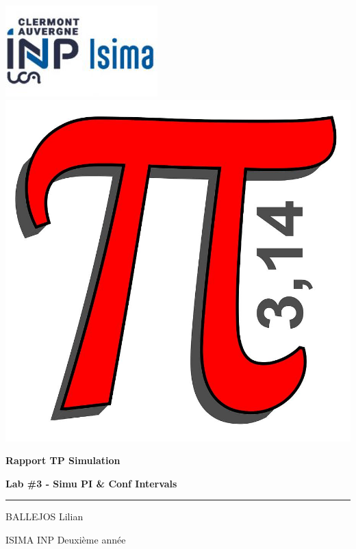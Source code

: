 \documentclass[12pt,french]{article} %
\begin{document}
\begin{titlepage} %

  
  \includegraphics[scale=0.6]{isima.png}
  \includegraphics[scale=0.10]{decoration.jpg}
  
  \vspace*{2.5cm} %
  
  \begin{center}\huge
    \textbf{Rapport TP Simulation} 
    
    \textbf{Lab \#3 - Simu PI \& Conf Intervals}
  \end{center}
  
  \hrule %
  
  \begin{center}
    \Large BALLEJOS Lilian
    
    \large
    ISIMA INP Deuxième année
    

\end{center}
\end{titlepage}
\end{document}
